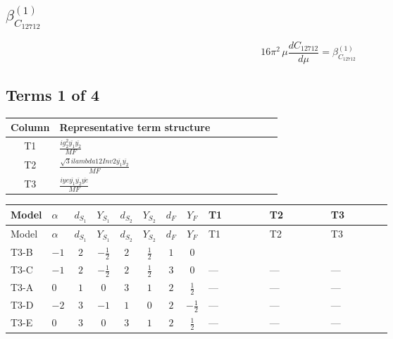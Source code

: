 \documentclass[8pt]{article}
\begin{document}
\begin{landscape}
\section*{$\beta_{C_{12712}}^{(1)}$}
\[16\pi^2\,\mu\frac{d C_{12712}}{d\mu}=\beta_{C_{12712}}^{(1)}\]
\subsection*{Terms 1 of 4}
\begin{center}
\begin{tabular}{@{}c >{\raggedright\arraybackslash}p{0.82\linewidth}@{}}
\toprule
Column & Representative term structure \\
\midrule
T1 & \(\displaystyle \frac{i g_{2}^{2} \overline{y_{1}} \overline{y_{2}}}{MF}\) \\
\midrule
T2 & \(\displaystyle \frac{\sqrt{3} i lambda12Inv2 \overline{y_{1}} \overline{y_{2}}}{MF}\) \\
\midrule
T3 & \(\displaystyle \frac{i ye \overline{y_{1}} \overline{y_{2}} \overline{ye}}{MF}\) \\
\midrule
\bottomrule
\end{tabular}
\end{center}
\smallskip
\tiny
\begin{longtable}{@{}llcccccc >{\raggedright\arraybackslash}p{0.21\linewidth} >{\raggedright\arraybackslash}p{0.21\linewidth} >{\raggedright\arraybackslash}p{0.21\linewidth}@{}}
\toprule
Model & $\alpha$ & $d_{S_1}$ & $Y_{S_1}$ & $d_{S_2}$ & $Y_{S_2}$ & $d_F$ & $Y_F$ & T1 & T2 & T3 \\
\midrule
\endfirsthead
\toprule
Model & $\alpha$ & $d_{S_1}$ & $Y_{S_1}$ & $d_{S_2}$ & $Y_{S_2}$ & $d_F$ & $Y_F$ & T1 & T2 & T3 \\
\midrule
\endhead
T3-B & $-1$ & $2$ & $-\frac{1}{2}$ & $2$ & $\frac{1}{2}$ & $1$ & $0$ & \scriptsize\adjustbox{max width=\linewidth}{$\begin{gathered} - \frac{3 i g_{2}^{2} \overline{y_{1}} \overline{y_{2}}}{8 MF}\end{gathered}$} & \scriptsize\adjustbox{max width=\linewidth}{$\begin{gathered} - \frac{\sqrt{3} i lambda12Inv2 \overline{y_{1}} \overline{y_{2}}}{6 MF}\end{gathered}$} & \scriptsize\adjustbox{max width=\linewidth}{$\begin{gathered} \frac{i ye \overline{y_{1}} \overline{y_{2}} \overline{ye}}{8 MF}\end{gathered}$} \\
\midrule
T3-C & $-1$ & $2$ & $-\frac{1}{2}$ & $2$ & $\frac{1}{2}$ & $3$ & $0$ & --- & --- & --- \\
\midrule
T3-A & $0$ & $1$ & $0$ & $3$ & $1$ & $2$ & $\frac{1}{2}$ & --- & --- & --- \\
\midrule
T3-D & $-2$ & $3$ & $-1$ & $1$ & $0$ & $2$ & $-\frac{1}{2}$ & --- & --- & --- \\
\midrule
T3-E & $0$ & $3$ & $0$ & $3$ & $1$ & $2$ & $\frac{1}{2}$ & --- & --- & --- \\
\midrule
\bottomrule
\end{longtable}
\clearpage

\end{landscape}
\end{document}
